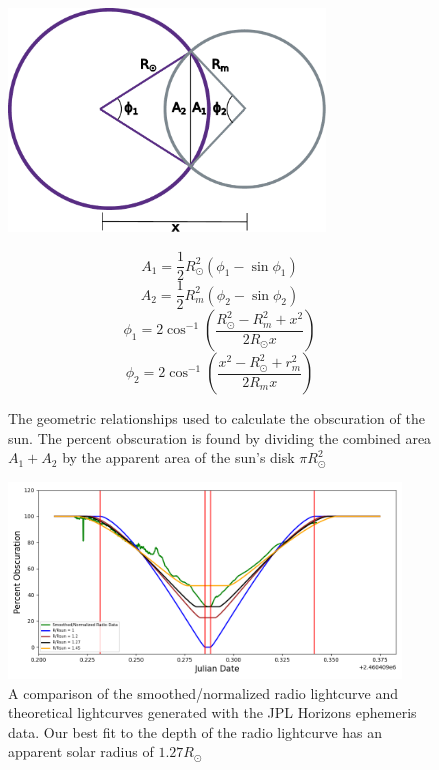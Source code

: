 \begin{figure}
\begin{minipage}{0.49\textwidth}
  \includegraphics[width=0.75\textwidth]{figures/drawing_updated}
  \caption{\label{fig:eclipse_geometry} The geometric relationships used to calculate the obscuration of the sun. The percent obscuration is found by dividing the combined area $A_1 + A_2$ by the apparent area of the sun's disk $\pi R_\odot^2$}
\end{minipage}
\hfill
\begin{minipage}{0.49\textwidth}
\begin{equation}\label{eq:geometry_1}
  A_1 = \frac{1}{2}R_{\odot}^2\left(\phi_1 - \sin\phi_1\right)
\end{equation}
\begin{equation}\label{eq:geometry_2}
  A_2 = \frac{1}{2}R_{m}^2\left(\phi_2 - \sin\phi_2\right)
\end{equation}
\begin{equation}\label{eq:geometry_3}
  \phi_1 = 2\cos^{-1}\left(\frac{R_{\odot}^2 - R_{m}^2+x^2}{2R_{\odot}x}\right)
\end{equation}
\begin{equation}\label{eq:geometry_4}
  \phi_2 = 2\cos^{-1}\left(\frac{x^2 - R_{\odot}^2 + r_{m}^2}{2R_{m}x}\right)
\end{equation}
\end{minipage}
\end{figure}



\begin{figure}
  \includegraphics[width=0.93\textwidth]{figures/RadiovsTheoretical}
  \caption{\label{fig:RadiovsTheoretical} A comparison of the smoothed/normalized radio lightcurve and theoretical lightcurves generated with the JPL Horizons ephemeris data. Our best fit to the depth of the radio lightcurve has an apparent solar radius of $1.27 R_{\odot}$}
\end{figure}

